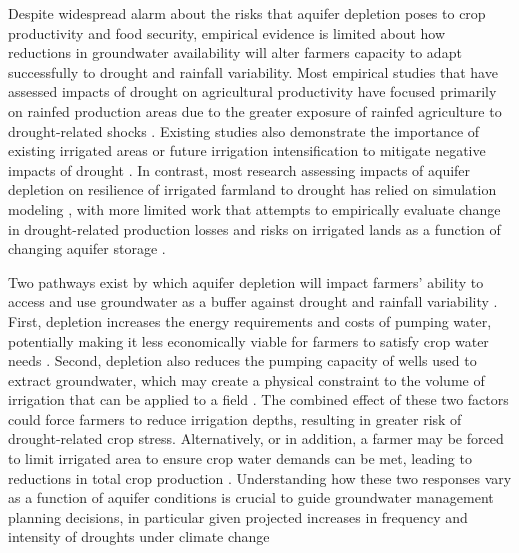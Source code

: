 \documentclass[
]{article}
\begin{document}
Despite widespread alarm about the risks that aquifer depletion poses to crop productivity and food security, empirical evidence is limited about how reductions in groundwater availability will alter farmers capacity to adapt successfully to drought and rainfall variability. Most empirical studies that have assessed impacts of drought on agricultural productivity have focused primarily on rainfed production areas due to the greater exposure of rainfed agriculture to drought-related shocks \citep{schlenker2009nonlinear, lobell2014greater, schlenker2010robust, zhou2020connections, borgomeo2020impact}. Existing studies also demonstrate the importance of existing irrigated areas or future irrigation intensification to mitigate negative impacts of drought \citep{kuwayama2019estimating, zipper2016drought, zhu2022untangling, zhu2022warming, lu2020mapping, davis2019sensitivity, li2018changes}. In contrast, most research assessing impacts of aquifer depletion on resilience of irrigated farmland to drought has relied on simulation modeling \citep{foster2015well, cotterman2018groundwater, kahil2015modeling, yoon2021coupled, rad2020mod}, with more limited work that attempts to empirically evaluate change in drought-related production losses and risks on irrigated lands as a function of changing aquifer storage \citep{jain2021groundwater, suter2021depletion}.

Two pathways exist by which aquifer depletion will impact farmers' ability to access and use groundwater as a buffer against drought and rainfall variability \citep{foster2015analysis}. First, depletion increases the energy requirements and costs of pumping water, potentially making it less economically viable for farmers to satisfy crop water needs \citep{mieno2017price, bhattarai2021impact}. Second, depletion also reduces the pumping capacity of wells used to extract groundwater, which may create a physical constraint to the volume of irrigation that can be applied to a field \citep{konikow2005groundwater, foster2014modeling, hrozencik2017heterogeneous}. The combined effect of these two factors could force farmers to reduce irrigation depths, resulting in greater risk of drought-related crop stress. Alternatively, or in addition, a farmer may be forced to limit irrigated area to ensure crop water demands can be met, leading to reductions in total crop production \citep{foster2014modeling, rad2020effects}. Understanding how these two responses vary as a function of aquifer conditions is crucial to guide groundwater management planning decisions, in particular given projected increases in frequency and intensity of droughts under climate change \citep{ukkola2020robust, chiang2021evidence, cook2020twenty}
\end{document}
